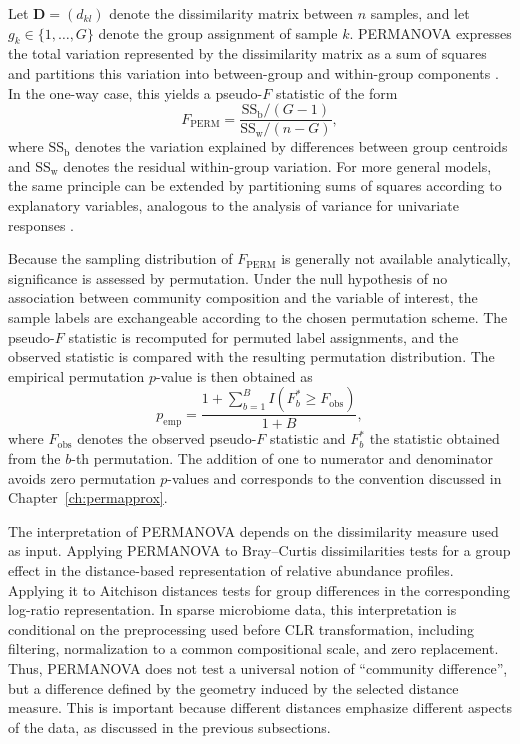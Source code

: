 Let $\mathbf{D}=(d_{kl})$ denote the dissimilarity matrix between $n$ samples, and let $g_k\in\{1,\ldots,G\}$ denote the group assignment of sample $k$. PERMANOVA expresses the total variation represented by the dissimilarity matrix as a sum of squares and partitions this variation into between-group and within-group components \citep{anderson2001new}. In the one-way case, this yields a pseudo-$F$ statistic of the form
\begin{equation}
F_{\mathrm{PERM}}=\frac{\mathrm{SS}_{\mathrm{b}}/(G-1)}{\mathrm{SS}_{\mathrm{w}}/(n-G)},
\end{equation}
where $\mathrm{SS}_{\mathrm{b}}$ denotes the variation explained by differences between group centroids and $\mathrm{SS}_{\mathrm{w}}$ denotes the residual within-group variation. For more general models, the same principle can be extended by partitioning sums of squares according to explanatory variables, analogous to the analysis of variance for univariate responses \citep{mcardle2001fitting,anderson2001new}.

Because the sampling distribution of $F_{\mathrm{PERM}}$ is generally not available analytically, significance is assessed by permutation. Under the null hypothesis of no association between community composition and the variable of interest, the sample labels are exchangeable according to the chosen permutation scheme. The pseudo-$F$ statistic is recomputed for permuted label assignments, and the observed statistic is compared with the resulting permutation distribution. The empirical permutation $p$-value is then obtained as
\begin{equation}
p_{\mathrm{emp}}=\frac{1+\sum_{b=1}^B I(F_b^\ast\geq F_{\mathrm{obs}})}{1+B},
\end{equation}
where $F_{\mathrm{obs}}$ denotes the observed pseudo-$F$ statistic and $F_b^\ast$ the statistic obtained from the $b$-th permutation. The addition of one to numerator and denominator avoids zero permutation $p$-values and corresponds to the convention discussed in Chapter~\ref{ch:permapprox}.

The interpretation of PERMANOVA depends on the dissimilarity measure used as input. Applying PERMANOVA to Bray--Curtis dissimilarities tests for a group effect in the distance-based representation of relative abundance profiles. Applying it to Aitchison distances tests for group differences in the corresponding log-ratio representation. In sparse microbiome data, this interpretation is conditional on the preprocessing used before CLR transformation, including filtering, normalization to a common compositional scale, and zero replacement. Thus, PERMANOVA does not test a universal notion of ``community difference'', but a difference defined by the geometry induced by the selected distance measure. This is important because different distances emphasize different aspects of the data, as discussed in the previous subsections.

